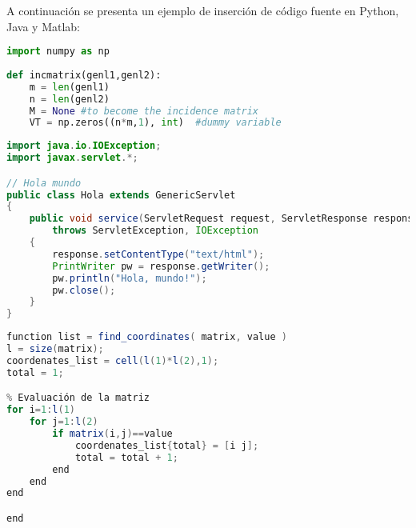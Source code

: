 		
\newpage	
{} %


	A continuación se presenta un ejemplo de inserción de código fuente en Python, Java y Matlab:

\lstset{style=Python}
\begin{lstlisting}[language=Python, caption=Ejemplo en Python]
import numpy as np
 
def incmatrix(genl1,genl2):
    m = len(genl1)
    n = len(genl2)
    M = None #to become the incidence matrix
    VT = np.zeros((n*m,1), int)  #dummy variable
\end{lstlisting}


\lstset{style=Java}
\begin{lstlisting}[language=Java, caption=Ejemplo en Java]
import java.io.IOException; 
import javax.servlet.*;

// Hola mundo
public class Hola extends GenericServlet 
{
    public void service(ServletRequest request, ServletResponse response)
        throws ServletException, IOException
    {
        response.setContentType("text/html");
        PrintWriter pw = response.getWriter();
        pw.println("Hola, mundo!");
        pw.close();
    }
}
\end{lstlisting}


\lstset{style=Matlab}
\begin{lstlisting}[language=Java, caption=Ejemplo en Matlab]
function list = find_coordinates( matrix, value )
l = size(matrix);
coordenates_list = cell(l(1)*l(2),1);
total = 1;

% Evaluación de la matriz
for i=1:l(1)
    for j=1:l(2)
        if matrix(i,j)==value
            coordenates_list{total} = [i j];
            total = total + 1;
        end
    end
end

end
\end{lstlisting}


